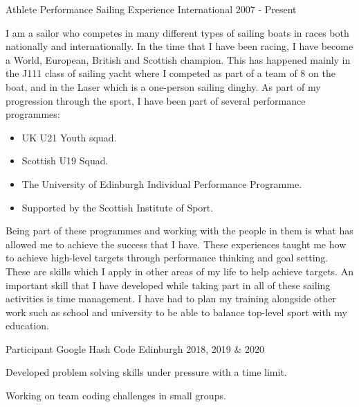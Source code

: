 


\begin{cventries}

    
  \cventry
    {Athlete} %
    {Performance Sailing Experience} %
    {International} %
    {2007 - Present} %
    {
      I am a sailor who competes in many different types of sailing boats in races both nationally and internationally. In the time that I have been racing, I have become a World, European, British and Scottish champion. This has happened mainly in the J111 class of sailing yacht where I competed as part of a team of 8 on the boat, and in the Laser which is a one-person sailing dinghy. As part of my progression through the sport, I have been part of several performance programmes:
      \begin{itemize}
          \item UK U21 Youth squad.
          \item Scottish U19 Squad.
          \item The University of Edinburgh Individual Performance Programme.
          \item Supported by the Scottish Institute of Sport.
      \end{itemize}
      Being part of these programmes and working with the people in them is what has allowed me to achieve the success that I have. These experiences taught me how to achieve high-level targets through performance thinking and goal setting. These are skills which I apply in other areas of my life to help achieve targets. An important skill that I have developed while taking part in all of these sailing activities is time management. I have had to plan my training alongside other work such as school and university to be able to balance top-level sport with my education.
    }

  \cventry
    {Participant} %
    {Google Hash Code} %
    {Edinburgh} %
    {2018, 2019 \& 2020} %
    {
      \begin{cvitems} %
        \item {Developed problem solving skills under pressure with a time limit.}
        \item {Working on team coding challenges in small groups.}
      \end{cvitems}
    }


\end{cventries}
